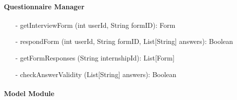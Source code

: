\paragraph{Questionnaire Manager}
\begin{itemize}
    \item[-] getInterviewForm (int userId, String formID): Form
    \item[-] respondForm (int userId, String formID, List[String] answers): Boolean
    \item[-] getFormResponses (String internshipId): List[Form]
    \item[-] checkAnswerValidity (List[String] answers): Boolean
\end{itemize}

\paragraph{Model Module}
